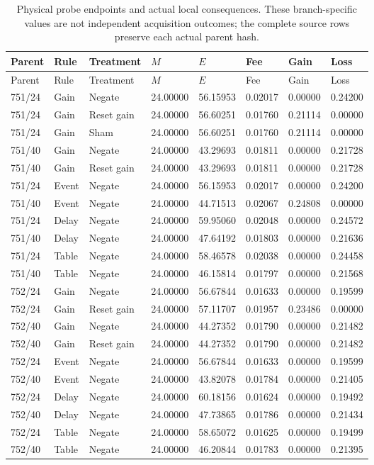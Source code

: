 \begin{longtable}{llllllll}
\caption{Physical probe endpoints and actual local consequences. These branch-specific values are not independent acquisition outcomes; the complete source rows preserve each actual parent hash.}\label{tab:local-history-probe-costs}\\
\toprule
Parent & Rule & Treatment & $M$ & $E$ & Fee & Gain & Loss \\
\midrule
\endfirsthead
\toprule
Parent & Rule & Treatment & $M$ & $E$ & Fee & Gain & Loss \\
\midrule
\endhead
751/24 & Gain & Negate & 24.00000 & 56.15953 & 0.02017 & 0.00000 & 0.24200 \\
751/24 & Gain & Reset gain & 24.00000 & 56.60251 & 0.01760 & 0.21114 & 0.00000 \\
751/24 & Gain & Sham & 24.00000 & 56.60251 & 0.01760 & 0.21114 & 0.00000 \\
751/40 & Gain & Negate & 24.00000 & 43.29693 & 0.01811 & 0.00000 & 0.21728 \\
751/40 & Gain & Reset gain & 24.00000 & 43.29693 & 0.01811 & 0.00000 & 0.21728 \\
751/24 & Event & Negate & 24.00000 & 56.15953 & 0.02017 & 0.00000 & 0.24200 \\
751/40 & Event & Negate & 24.00000 & 44.71513 & 0.02067 & 0.24808 & 0.00000 \\
751/24 & Delay & Negate & 24.00000 & 59.95060 & 0.02048 & 0.00000 & 0.24572 \\
751/40 & Delay & Negate & 24.00000 & 47.64192 & 0.01803 & 0.00000 & 0.21636 \\
751/24 & Table & Negate & 24.00000 & 58.46578 & 0.02038 & 0.00000 & 0.24458 \\
751/40 & Table & Negate & 24.00000 & 46.15814 & 0.01797 & 0.00000 & 0.21568 \\
752/24 & Gain & Negate & 24.00000 & 56.67844 & 0.01633 & 0.00000 & 0.19599 \\
752/24 & Gain & Reset gain & 24.00000 & 57.11707 & 0.01957 & 0.23486 & 0.00000 \\
752/40 & Gain & Negate & 24.00000 & 44.27352 & 0.01790 & 0.00000 & 0.21482 \\
752/40 & Gain & Reset gain & 24.00000 & 44.27352 & 0.01790 & 0.00000 & 0.21482 \\
752/24 & Event & Negate & 24.00000 & 56.67844 & 0.01633 & 0.00000 & 0.19599 \\
752/40 & Event & Negate & 24.00000 & 43.82078 & 0.01784 & 0.00000 & 0.21405 \\
752/24 & Delay & Negate & 24.00000 & 60.18156 & 0.01624 & 0.00000 & 0.19492 \\
752/40 & Delay & Negate & 24.00000 & 47.73865 & 0.01786 & 0.00000 & 0.21434 \\
752/24 & Table & Negate & 24.00000 & 58.65072 & 0.01625 & 0.00000 & 0.19499 \\
752/40 & Table & Negate & 24.00000 & 46.20844 & 0.01783 & 0.00000 & 0.21395 \\
\bottomrule
\end{longtable}
